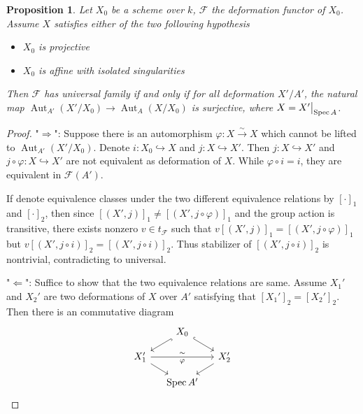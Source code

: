 \documentclass{ctexart}
\newtheorem{proposition}{Proposition}[section]
\newcommand{\aut}{\operatorname{Aut}}
\newcommand{\spec}{\operatorname{Spec}}
\begin{document}
\begin{proposition}
    Let $X_{0}$ be a scheme over $k$, $\mathcal{F}$ the deformation functor of $X_{0}$.
    Assume $X$ satisfies either of the two following hypothesis
    \begin{itemize}
        \item $X_{0}$ is projective
        \item $X_{0}$ is affine with isolated singularities
    \end{itemize}
    Then $\mathcal{F}$ has universal family if and only if for all deformation $X'/A'$,
    the natural map $\aut_{A'}(X'/X_{0}) \rightarrow \aut_{A}(X/X_{0})$ is surjective, where $X = X'\big{|}_{\spec A}$. 
    \label{Proposition 4.2}
\end{proposition}
\begin{proof}
    "$\Rightarrow$": Suppose there is an automorphism $\varphi: X \overset{\sim}{\rightarrow} X$ which cannot be lifted to $\aut_{A'}(X'/X_{0})$.
    Denote $i: X_{0} \hookrightarrow X$ and $j: X \hookrightarrow X'$.
    Then $j: X \hookrightarrow X'$ and $j \circ \varphi: X \hookrightarrow X'$ are not equivalent as deformation of $X$.
    While $\varphi \circ i = i$, they are equivalent in $\mathcal{F}(A')$.
    \par
    If denote equivalence classes under the two different equivalence relations by $[\cdot]_{1}$ and $[\cdot]_{2}$,
    then since $[(X', j)]_{1} \neq [(X', j \circ \varphi)]_{1}$ and the group action is transitive, 
    there exists nonzero $v\in t_{\mathcal{F}}$ such that $v[(X', j)]_{1} = [(X', j \circ \varphi)]_{1}$ but $v[(X', j \circ i)]_{2} = [(X', j \circ i)]_{2}$.
    Thus stabilizer of $[(X', j \circ i)]_{2}$ is nontrivial, contradicting to universal.
    \par
    "$\Leftarrow$": Suffice to show that the two equivalence relations are same.
    Assume $X_{1}'$ and $X_{2}'$ are two deformations of $X$ over $A'$ satisfying that $[X_{1}']_{2} = [X_{2}']_{2}$.
    Then there is an commutative diagram
    \begin{equation}
        \begin{tikzcd}[sep = small]
            & X_{0} \arrow[dr, hookrightarrow] \arrow[dl, hookrightarrow] & \\
            X_{1}' \arrow[rr, "\sim", "\varphi" swap] \arrow[dr] &&
            X_{2}' \arrow[dl] \\
            & \spec A' &
        \end{tikzcd}
    \end{equation}

\end{proof}
\end{document}
